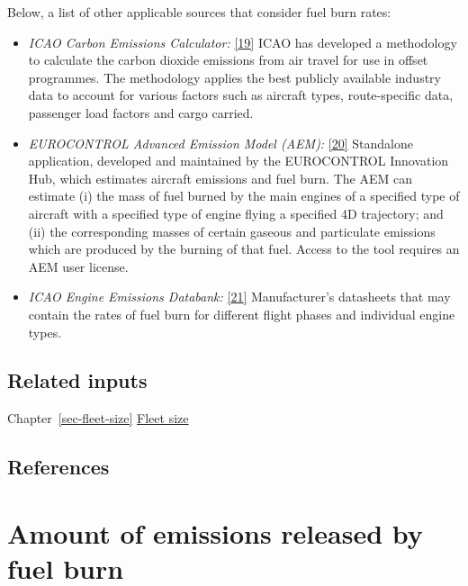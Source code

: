 \documentclass[
  11pt,
  a4paper,
]{book}
\begin{document}
Below, a list of other applicable sources that consider fuel burn rates:

\begin{itemize}
\item
  \emph{ICAO Carbon Emissions Calculator:}
  \protect\hyperlink{ref-emissionscalc}{{[}19{]}} ICAO has developed a
  methodology to calculate the carbon dioxide emissions from air travel
  for use in offset programmes. The methodology applies the best
  publicly available industry data to account for various factors such
  as aircraft types, route-specific data, passenger load factors and
  cargo carried.
\item
  \emph{EUROCONTROL Advanced Emission Model (AEM):}
  \protect\hyperlink{ref-ectrl:em:model}{{[}20{]}} Standalone
  application, developed and maintained by the EUROCONTROL Innovation
  Hub, which estimates aircraft emissions and fuel burn. The AEM can
  estimate (i) the mass of fuel burned by the main engines of a
  specified type of aircraft with a specified type of engine flying a
  specified 4D trajectory; and (ii) the corresponding masses of certain
  gaseous and particulate emissions which are produced by the burning of
  that fuel. Access to the tool requires an AEM user license.
\item
  \emph{ICAO Engine Emissions Databank:}
  \protect\hyperlink{ref-icao:databank}{{[}21{]}} Manufacturer's
  datasheets that may contain the rates of fuel burn for different
  flight phases and individual engine types.
\end{itemize}

\hypertarget{related-inputs-5}{%
\section{Related inputs}\label{related-inputs-5}}

Chapter~\ref{sec-fleet-size} \protect\hyperlink{sec-fleet-size}{Fleet
size}

\hypertarget{references-6}{%
\section{References}\label{references-6}}

\hypertarget{sec-amount-of-emissions-released-by-fuel-burn}{%
\chapter{Amount of emissions released by fuel
burn}\label{sec-amount-of-emissions-released-by-fuel-burn}}
\end{document}
